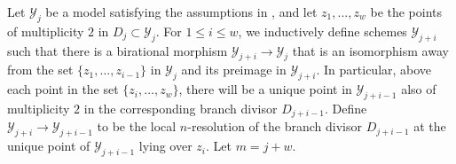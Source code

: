\documentclass[12pt]{amsart}
\numberwithin{equation}{section}
\theoremstyle{definition}
\renewcommand{\P}{\mathbb P}
\newcommand{\Y}{\mathcal{Y}}
\newcommand{\tx}[1]{\text{#1}}
\begin{document}
    
    Let $\Y_j$ be a model satisfying the assumptions in
    , and let $z_1,...,z_w$ be the points of
    multiplicity $2$ in $D_j \subset \Y_j$. For $1\leq i\leq w$, we
    inductively define schemes $\Y_{j+i}$ such that there is a
    birational morphism $\Y_{j+i} \rightarrow \Y_j$ that is an
    isomorphism away from the set $\{z_1,\ldots,z_{i-1}\}$ in $\Y_j$
    and its preimage in $\Y_{j+i}$. In particular, above each point in
    the set $\{z_{i},\ldots,z_w\}$, there will be a unique point in
    $\Y_{j+i-1}$ also of multiplicity $2$ in the corresponding branch
    divisor $D_{j+i-1}$. Define $\Y_{j+i}\to\Y_{j+i-1}$ to be the
    local $n$-resolution of the branch divisor $D_{j+i-1}$ at the
    unique point of $\Y_{j+i-1}$ lying over $z_i$.
    Let $m=j+w$.
\end{document}
